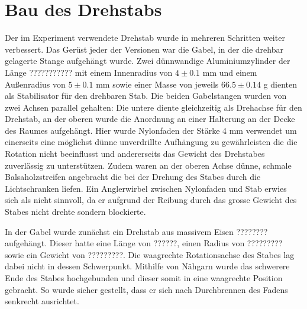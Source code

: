 \documentclass[11pt]{scrartcl}
\begin{document}
\section{Bau des Drehstabs} %


Der im Experiment verwendete Drehstab wurde in mehreren Schritten weiter verbessert. Das Ger\"ust jeder der Versionen war die Gabel, in der die drehbar gelagerte Stange aufgeh\"angt wurde. Zwei d\"unnwandige Aluminiumzylinder der L\"ange ??????????? mit einem Innenradius von $4\pm 0.1$ mm und einem Au\ss{}enradius von $5\pm 0.1$ mm sowie einer Masse von jeweils $66.5\pm 0.14$ g dienten als Stabilisator f\"ur den drehbaren Stab. Die beiden Gabelstangen wurden von zwei Achsen parallel gehalten: Die untere diente gleichzeitig als Drehachse f\"ur den Drehstab, an der oberen wurde die Anordnung an einer Halterung an der Decke des Raumes aufgeh\"angt. Hier wurde Nylonfaden der St\"arke 4 mm verwendet um einerseits eine m\"oglichst d\"unne unverdrillte Aufh\"angung zu gew\"ahrleisten die die Rotation nicht beeinflusst und andererseits das Gewicht des Drehstabes zuverl\"assig zu unterst\"utzen. Zudem waren an der oberen Achse d\"unne, schmale Balsaholzstreifen angebracht die bei der Drehung des Stabes durch die Lichtschranken liefen. Ein Anglerwirbel zwischen Nylonfaden und Stab erwies sich als nicht sinnvoll, da er aufgrund der Reibung durch das grosse Gewicht des Stabes nicht drehte sondern blockierte.

In der Gabel wurde zun\"achst ein Drehstab aus massivem Eisen ???????? aufgeh\"angt. Dieser hatte eine L\"ange von ??????, einen Radius von ????????? sowie ein Gewicht von ?????????. Die waagrechte Rotationsachse des Stabes lag dabei nicht in dessen Schwerpunkt. Mithilfe von N\"ahgarn wurde das schwerere Ende des Stabes hochgebunden und dieser somit in eine waagrechte Position gebracht. So wurde sicher gestellt, dass er sich nach Durchbrennen des Fadens senkrecht ausrichtet.
\end{document}
